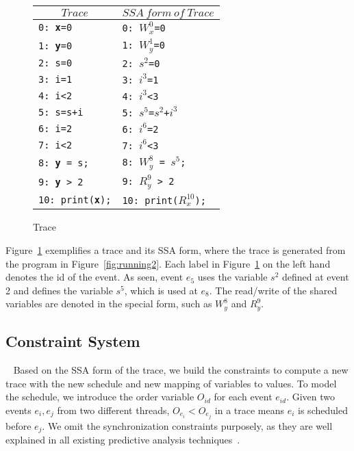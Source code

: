 
\begin{figure}
\centering
\begin{tabular}{l|l}
\hline
\multicolumn{1}{c}{$Trace$} & \multicolumn{1}{c}{$SSA \ form \ of\   Trace$} \\
\hline
{\tt 0: {\bf x}=0} &  {\tt 0: $W^0_x$=0}    \\
{\tt 1: {\bf y}=0} &   {\tt 1: $W^1_y$=0}   \\
{\tt 2: s=0} &  {\tt 2: $s^2$=0}   \\
{\tt 3: i=1} &     {\tt 3: $i^3$=1}   \\
{\tt 4: i<2} &    {\tt 4: $i^3$<3} \\
{\tt 5: s=s+i} & {\tt 5: $s^5$=$s^2$+$i^3$}   \\
{\tt 6: i=2} &       {\tt 6: $i^6$=2}  \\
{\tt 7: i<2} &      {\tt 7: $i^6$<3}  \\
{\tt 8: {\bf y} = s;} &  {\tt 8: $W^{8}_y$ = $s^5$;}  \\
{\tt 9: {\bf y} > 2}  &    {\tt 9: $R^{9}_y$ > 2} \\
{\tt 10: print({\bf x});} &  {\tt 10: print($R^{10}_x$);}  \\
\end{tabular}
\caption{Trace}
\label{fig:t4running2}
\end{figure}

Figure~\ref{fig:t4running2} exemplifies a trace and its SSA form, where the trace is generated from the program in Figure~\ref{fig:running2}.
Each label in  Figure~\ref{fig:t4running2} on the left hand denotes the id of the event. As seen, event $e_5$ uses the variable $s^2$ defined at event 2 and defines the variable $s^5$, which is used at $e_8$. The read/write of the shared variables are denoted in the special form, such as $W^{8}_y$ and  $R^{9}_y$.





\subsection{Constraint System}~\label{sec:constraints}
Based on the SSA form of the trace, we build the constraints to compute a new trace with the new schedule and new mapping of variables to values.
To model the schedule, we introduce the order variable $O_{id}$ for each event $e_{id}$. Given two events $e_i, e_j$ from two different threads, $O_{e_i}<O_{e_j}$ in a trace means $e_i$ is scheduled before $e_j$. We omit the synchronization constraints purposely, as they are well explained in all existing predictive analysis techniques~\cite{yannis, pldi14}.




